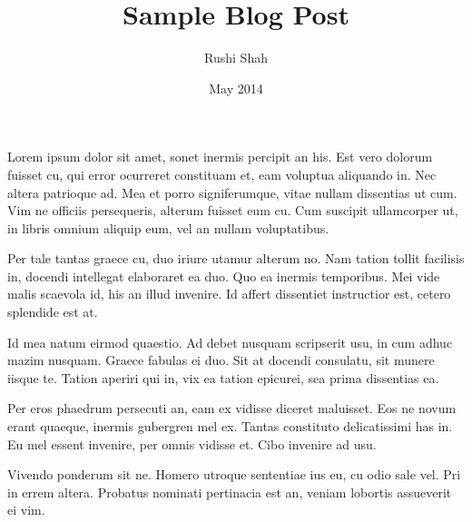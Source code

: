 \documentclass{article}
\title{Sample Blog Post}
\author{Rushi Shah}
\date{May 2014}
\begin{document}
	\maketitle

	Lorem ipsum dolor sit amet, sonet inermis percipit an his. Est vero dolorum fuisset cu, qui error ocurreret constituam et, eam voluptua aliquando in. Nec altera patrioque ad. Mea et porro signiferumque, vitae nullam dissentias ut cum. Vim ne officiis persequeris, alterum fuisset eum cu. Cum suscipit ullamcorper ut, in libris omnium aliquip eum, vel an nullam voluptatibus.

        Per tale tantas graece cu, duo iriure utamur alterum no. Nam tation tollit facilisis in, docendi intellegat elaboraret ea duo. Quo ea inermis temporibus. Mei vide malis scaevola id, his an illud invenire. Id affert dissentiet instructior est, cetero splendide est at.

        Id mea natum eirmod quaestio. Ad debet nusquam scripserit usu, in cum adhuc mazim nusquam. Graece fabulas ei duo. Sit at docendi consulatu, sit munere iisque te. Tation aperiri qui in, vix ea tation epicurei, sea prima dissentias ea.

        Per eros phaedrum persecuti an, eam ex vidisse diceret maluisset. Eos ne novum erant quaeque, inermis gubergren mel ex. Tantas constituto delicatissimi has in. Eu mel essent invenire, per omnis vidisse et. Cibo invenire ad usu.

        Vivendo ponderum sit ne. Homero utroque sententiae ius eu, cu odio sale vel. Pri in errem altera. Probatus nominati pertinacia est an, veniam lobortis assueverit ei vim.
\end{document}
